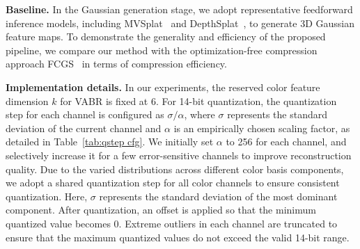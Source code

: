 \documentclass[lettersize,journal]{IEEEtran}
\begin{document}
\textbf{Baseline.}
In the Gaussian generation stage, we adopt representative feedforward inference models, including MVSplat~\cite{mvsplat} and DepthSplat~\cite{xu2024depthsplat}, to generate 3D Gaussian feature maps. To demonstrate the generality and efficiency of the proposed pipeline, we compare our method with the optimization-free compression approach FCGS~\cite{chen2024fcgc} in terms of compression efficiency.

\textbf{Implementation details.}
In our experiments, the reserved color feature dimension $k$ for VABR is fixed at 6.
For 14-bit quantization, the quantization step for each channel is configured as $\sigma/\alpha$, where $\sigma$ represents the standard deviation of the current channel and $\alpha$ is an empirically chosen scaling factor, as detailed in Table~\ref{tab:qstep cfg}. 
We initially set $\alpha$ to 256 for each channel, and selectively increase it for a few error-sensitive channels to improve reconstruction quality.
Due to the varied distributions across different color basis components, we adopt a shared quantization step for all color channels to ensure consistent quantization. Here, $\sigma$ represents the standard deviation of the most dominant component.
After quantization, an offset is applied so that the minimum quantized value becomes $0$.
Extreme outliers in each channel are truncated to ensure that the maximum quantized values do not exceed the valid 14-bit range.
\end{document}
